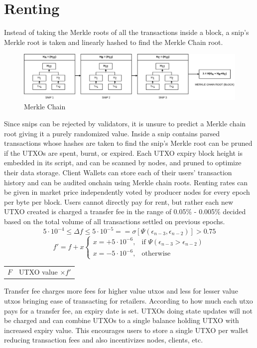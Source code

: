 \documentclass[a4paper,10pt]{article}
\makeatletter
\newenvironment{conditions}
  {\par\vspace{\abovedisplayskip}\noindent\begin{tabular}{>{$}l<{$} @{${}={}$} l}}
  {\end{tabular}\par\vspace{\belowdisplayskip}}
\makeatother
\begin{document}
\section{Renting}
Instead of taking the Merkle roots of all the transactions inside a block, a snip's Merkle root is taken and linearly hashed to find the Merkle Chain root. \\
\begin{figure}[h]
\begin{center}
\includegraphics[width=13cm]{merklechain}
\caption{Merkle Chain}
\end{center}
\end{figure}
\indent Since snips can be rejected by validators, it is unsure to predict a Merkle chain root giving it a purely randomized value. Inside a snip contains parsed transactions whose hashes are taken to find the snip's Merkle root can be pruned if the UTXOs are spent, burnt, or expired. Each UTXO expiry block height is embedded in its script, and can be scanned by nodes, and pruned to optimize their data storage. Client Wallets can store each of their users' transaction history and can be audited onchain using Merkle chain roots. Renting rates can be given in market price independently voted by producer nodes for every epoch per byte per block. Users cannot directly pay for rent, but rather each new UTXO created is charged a transfer fee in the range of 0.05\% - 0.005\% decided based on the total volume of all transactions settled on previous epochs.
\begin{equation*}
5 \cdot 10^{-4} \leq \Delta f \leq 5 \cdot 10^{-5} == \sigma [\Psi (\epsilon_{n-3}, \epsilon_{n-2})] > 0.75
\end{equation*}
\begin{equation*}
f'=f+x \begin{cases}
x=+5 \cdot 10^{-6}, & \text{if } \Psi (\epsilon_{n-3} > \epsilon_{n-2})\\
x=-5 \cdot 10^{-6}, & \text{otherwise}
\end{cases}
\end{equation*}
\begin{conditions}
F & UTXO value $\times f'$ 
\end{conditions}
 Transfer fee charges more fees for higher value utxos and less for lesser value utxos bringing ease of transacting for retailers. According to how much each utxo pays for a transfer fee, an expiry date is set. UTXOs doing state updates will not be charged and can combine UTXOs to a single balance holding UTXO with increased expiry value. This encourages users to store a single UTXO per wallet reducing transaction fees and also incentivizes nodes, clients, etc.  
\end{document}

